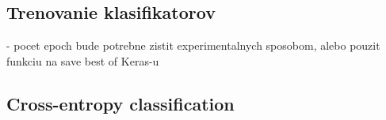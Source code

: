 \begin{comment}
  \section{scikit-learn}
    \label{sec:scikitlearn}

    Scikit-learn je softvérová knižica pre strojové učenie pre programovací jazyk Python.
    Obsahuje množstvo algoritmov pre klasifikáciu, regresiu alebo zhlukovanie dát \cite{odkaz:scikitlearn}.
    Pre riešenie tejto práce obsahuje vhodné triedy, ktoré implementujú spomínané postupy zo sekcie \ref{sec:klasifikacia}.
    Príklady tried pre jednotlivé algoritmy:
    \begin{enumerate}
        \item[$\bullet$] \textbf{Nearest Neighbors} - scikit-learn poskytuje 2 rôzne klasifikátory pre algoritmus najbližsieho suseda.
        Trieda \textit{KNeighborsClassifier} klasifikuje na základe $k$ najbližšich susedov, kde $k$ je celé číslo špecifikované užívateľom.
        Druhá trieda \textit{RadiusNeighborsClassifier} implementuje klasifikáciu na základe počtu susedov v rámci pevného polomeru $r$ každého trénovacieho bodu,
        kde $r$ je hodnota s pohyblivou desatinou čiarkou určená užívateľom\footnote{\url{http://scikit-learn.org/stable/modules/neighbors.html\#nearest-neighbors-classification}}.
        \item[$\bullet$] \textbf{Support Vector Machines} - \textit{SVC}, \textit{NuSVC} a \textit{LinearSVC} sú triedy pre viac-triednu klasifikáciu.
        Pre ktoré je možné použit rôzne typy jadier[eng. kernels] \footnote{\url{http://scikit-learn.org/stable/modules/svm.html\#custom-kernels}}.
        \item[$\bullet$] \textbf{Stochastic Gradient Descent} - \textit{SGDClassifier} podporuje viac-triednu klasifikáciu pomocou kombinácie viacerých binárnych klasifikátorov v tzv.“one versus all” (OVA) schéme \footnote{\url{http://scikit-learn.org/stable/modules/sgd.html\#stochastic-gradient-descent}}.
    \end{enumerate}

\end{comment}

\subsection{Trenovanie klasifikatorov}
- pocet epoch bude potrebne zistit experimentalnych sposobom, alebo pouzit funkciu na save best of Keras-u

\subsection{Cross-entropy classification}
